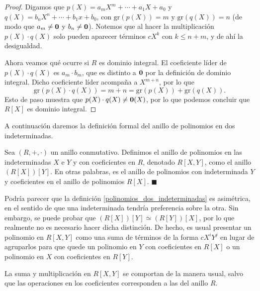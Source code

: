 \begin{proof}
Digamos que $p(X) = a_mX^m + \cdots + a_1X + a_0$ y $q(X) = b_nX^n + \cdots + b_1x+b_0$, con $\mathrm{gr}(p(X)) = m$ y $\mathrm{gr}(q(X)) = n$ (de modo que $a_m \neq \mathbf{0}$ y $b_n \neq \mathbf{0}$). Notemos que al hacer la multiplicación $p(X) \cdot q(X)$ solo pueden aparecer términos $c X^k$ con $k \leq n + m$, y de ahí la desigualdad.

Ahora veamos qué ocurre si $R$ es dominio integral. El coeficiente líder de $p(X) \cdot q(X)$ es $a_m \cdot b_m$, que es distinto a $\mathbf{0}$ por la definición de dominio integral. Dicho coeficiente líder acompaña a $X^{m+n}$, por lo que 
$$\mathrm{gr}(p(X) \cdot q(X)) = m + n = \mathrm{gr}(p(X)) + \mathrm{gr}(q(X)).$$
Esto de paso muestra que $p(X) \cdot q(X) \neq \mathbf{0}(X)$, por lo que podemos concluir que $R[X]$ es dominio integral.
\end{proof}

A continuación daremos la definición formal del anillo de polinomios en dos indeterminadas.

\begin{definition} \label{polinomios_dos_indeterminadas}
Sea $(R, +, \cdot)$ un anillo conmutativo. Definimos el anillo de polinomios en las indeterminadas $X$ e $Y$ y con coeficientes en $R$, denotado $R[X, Y]$, como el anillo $(R[X])[Y]$. En otras palabras, es el anillo de polinomios con indeterminada $Y$ y coeficientes en el anillo de polinomios $R[X]$.
\hfill$\blacksquare$
\end{definition}

Podría parecer que la definición \ref{polinomios_dos_indeterminadas} es asimétrica, en el sentido de que una indeterminada tendría preferencia sobre la otra. Sin embargo, se puede probar que $(R[X])[Y] \simeq (R[Y])[X]$, por lo que realmente no es necesario hacer dicha distinción. De hecho, es usual presentar un polinomio en $R[X,Y]$ como una suma de términos de la forma $c X^i Y^j$ en lugar de agruparlos para que quede un polinomio en $Y$ con coeficientes en $R[X]$ o un polinomio en $X$ con coeficientes en $R[Y]$. 

La suma y multiplicación en $R[X,Y]$ se comportan de la manera usual, salvo que las operaciones en los coeficientes corresponden a las del anillo $R$.

